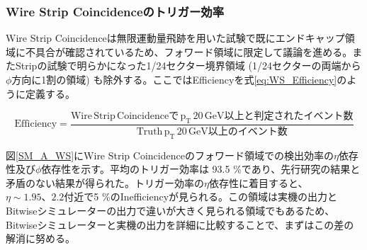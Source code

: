 \subsubsection{Wire Strip Coincidenceのトリガー効率}
Wire Strip Coincidenceは無限運動量飛跡を用いた試験で既にエンドキャップ領域に不具合が確認されているため、フォワード領域に限定して議論を進める。またStripの試験で明らかになった1/24セクター境界領域 (1/24セクターの両端から$\phi$方向に1割の領域) も除外する。ここではEfficiencyを式\ref{eq:WS_Efficiency}のように定義する。

\begin{equation}
    \mathrm {Efficiency} = \frac{\mathrm{Wire\,Strip\, Coincidenceで\,p_\mathrm{T} \,20\,GeV以上と判定されたイベント数}}{\mathrm{Truth\,p_\mathrm{T}\,20 \,GeV以上のイベント数}}
    \label{eq:WS_Efficiency}
\end{equation}

図\ref{SM_A_WS}にWire Strip Coincidenceのフォワード領域での検出効率の$\eta$依存性及び$\phi$依存性を示す。平均のトリガー効率は 93.5 \%であり、先行研究\cite{mt_kawamoto}の結果と矛盾のない結果が得られた。トリガー効率の$\eta$依存性に着目すると、$\eta\sim1.95、2.2$付近で5 \%のInefficiencyが見られる。この領域は実機の出力とBitwiseシミュレーターの出力で違いが大きく見られる領域でもあるため、Bitwiseシミュレーターと実機の出力を詳細に比較することで、まずはこの差の解消に努める。

